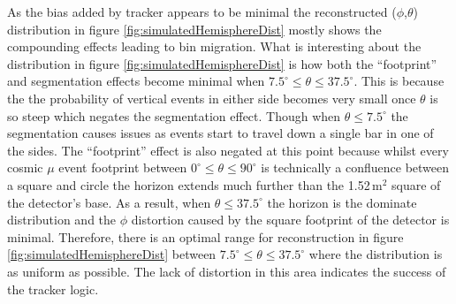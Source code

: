As the bias added by tracker appears to be minimal the reconstructed ($\phi$,$\theta$) distribution in figure \ref{fig:simulatedHemisphereDist} mostly shows the compounding effects leading to bin migration. What is interesting about the distribution in figure \ref{fig:simulatedHemisphereDist} is how both the ``footprint'' and segmentation effects become minimal when $7.5^\circ \leq \theta \leq 37.5^\circ$. This is because the the probability of vertical events in either side becomes very small once $\theta$ is so steep which negates the segmentation effect. Though when $\theta \leq 7.5^\circ$ the segmentation causes issues as events start to travel down a single bar in one of the sides. The ``footprint''  effect is also negated at this point because whilst every cosmic $\mu$ event footprint between $0^\circ \leq \theta \leq 90^\circ$ is technically a confluence between a square and circle the horizon extends much further than the 1.52\,m$^2$ square of the detector's base. As a result, when $\theta \leq 37.5^\circ$  the horizon is the dominate distribution and the $\phi$ distortion caused by the square footprint of the detector is minimal. Therefore, there is an optimal range for reconstruction in figure \ref{fig:simulatedHemisphereDist} between $7.5^\circ \leq \theta \leq 37.5^\circ$ where the distribution is as uniform as possible. The lack of distortion in this area indicates the success of the tracker logic. 

